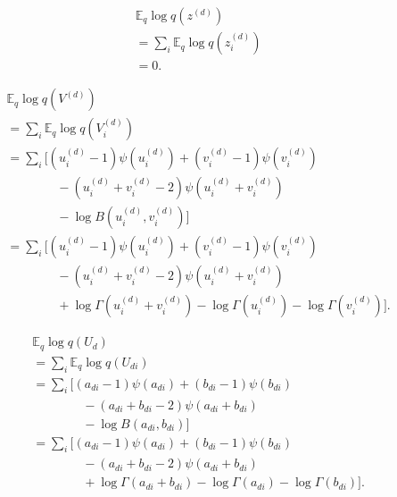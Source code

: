 \documentclass{article}
\newcommand{\Eq}{\ensuremath{\mathbb{E}_q\xspace}}
\begin{document}
\begin{align*}
    &\Eq \log q\left(z^{(d)}\right) \\
    &= \sum_i \Eq \log q\left(z_i^{(d)}\right) \\
    &= 0 .
\end{align*}

\begin{align*}
    &\Eq \log q\left(V^{(d)}\right) \\
    &= \sum_i \Eq \log q\left(V_i^{(d)}\right) \\
    &= \sum_i \Bigg[ (u_i^{(d)} - 1) \psi\left(u_i^{(d)}\right) + (v_i^{(d)} - 1) \psi\left(v_i^{(d)}\right) \\
    &\qquad\qquad - (u_i^{(d)} + v_i^{(d)} - 2) \psi\left(u_i^{(d)} + v_i^{(d)}\right) \\
    &\qquad\qquad - \log B\left(u_i^{(d)}, v_i^{(d)}\right) \Bigg] \\
    &= \sum_i \Bigg[ (u_i^{(d)} - 1) \psi\left(u_i^{(d)}\right) + (v_i^{(d)} - 1) \psi\left(v_i^{(d)}\right) \\
    &\qquad\qquad - (u_i^{(d)} + v_i^{(d)} - 2) \psi\left(u_i^{(d)} + v_i^{(d)}\right) \\
    &\qquad\qquad + \log \Gamma\left(u_i^{(d)} + v_i^{(d)}\right) - \log\Gamma\left(u_i^{(d)}\right) - \log\Gamma\left(v_i^{(d)}\right) \Bigg] .
\end{align*}

\begin{align*}
    &\Eq \log q\left(U_d\right) \\
    &= \sum_i \Eq \log q\left(U_{di}\right) \\
    &= \sum_i \Bigg[ (a_{di} - 1) \psi\left(a_{di}\right) + (b_{di} - 1) \psi\left(b_{di}\right) \\
    &\qquad\qquad - (a_{di} + b_{di} - 2) \psi\left(a_{di} + b_{di}\right) \\
    &\qquad\qquad - \log B\left(a_{di}, b_{di}\right) \Bigg] \\
    &= \sum_i \Bigg[ (a_{di} - 1) \psi\left(a_{di}\right) + (b_{di} - 1) \psi\left(b_{di}\right) \\
    &\qquad\qquad - (a_{di} + b_{di} - 2) \psi\left(a_{di} + b_{di}\right) \\
    &\qquad\qquad + \log \Gamma\left(a_{di} + b_{di}\right) - \log\Gamma\left(a_{di}\right) - \log\Gamma\left(b_{di}\right) \Bigg] .
\end{align*}
\end{document}
